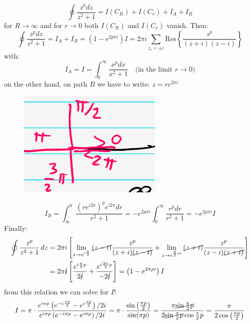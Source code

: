 \documentclass{article}
\begin{document}
\begin{equation}
    \oint \frac{z^p dz}{z^2 + 1} = I(C_R) + I(C_r) + I_A + I_B
\end{equation}
for $R\rightarrow \infty$ and for $r \rightarrow 0$ both $I(C_R)$ and $I(C_r)$ vanish. Then:
\begin{equation}
    \oint \frac{z^p dz}{z^2 + 1} = I_A + I_B = (1-e^{2p \pi i})I = 2\pi i \sum_{z_i = \pm i} \text{Res} \left\{ \frac{z^p}{(z+i)(z-i)} \right\}
\end{equation}
with:
\begin{equation}
    I_A = I = \int_0^\infty \frac{x^p dx }{x^2 + 1} \quad \text{(in the limit $r \rightarrow 0$)}
\end{equation}
on the other hand, on path $B$ we have to write: $z = re^{2\pi i }$
\begin{figure}[h]
    \centering
    \includegraphics[width=0.25\linewidth]{fig41.png}
\end{figure}
\begin{equation}
    I_B = \int_\infty^0 \frac{(re^{i2\pi})^p e^{i2\pi}dr}{r^2 + 1} = -e^{2p\pi i }\int_0^\infty \frac{r^p dr}{r^2 + 1 } = -e^{2p\pi i}I
\end{equation}
Finally:
\begin{align*}
    \oint \frac{z^p}{z^2 + 1} \, dz 
&= 2\pi i \left[ 
\lim_{z \to e^{i\frac{\pi}{2}}} \cancel{(z-i)}\frac{z^p}{(z+i)\cancel{(z-i)}}
+ \lim_{z \to e^{\frac{3}{2}i\pi}} \cancel{(z+i)} \frac{z^p}{(z-i)\cancel{(z+i)}}
\right]\\
&= 2\pi \cancel{i} \left[ \frac{e^{i\frac{\pi}{2}p}}{2\cancel{i}} + \frac{e^{i\frac{3\pi}{2}p}}{-2\cancel{i}} \right] 
= \left(1 - e^{2\pi pi} \right) I
\end{align*}
from this relation we can solve for $I$!
\begin{equation}
    I = \pi \cdot \frac{e^{i\pi p} \left(e^{-i\frac{\pi p}{2}} - e^{i\frac{\pi p}{2}} \right) / 2i}
{e^{i\pi p} \left(e^{-i\pi p} - e^{i\pi p} \right) / 2i}
= \pi \cdot \frac{\sin\left( \frac{\pi p}{2} \right)}{\sin(\pi p)} = \frac{\pi \cancel{\sin\frac{\pi}{2}p}}{2 \cancel{\sin\frac{\pi}{2}p} \cos\frac{\pi}{2}p }
= \frac{\pi}{2 \cos\left( \frac{\pi p}{2} \right)}
\end{equation}
\end{document}
